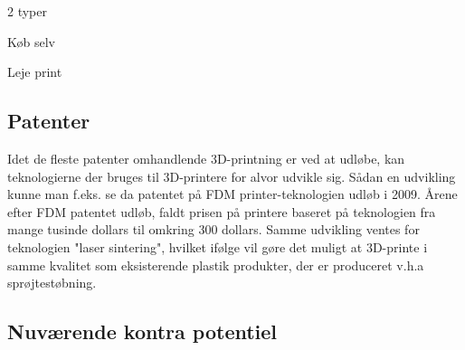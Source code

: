 2 typer

Køb selv

Leje print

\subsection{Patenter} %

Idet de fleste patenter omhandlende 3D-printning er ved at udløbe, kan teknologierne der bruges til 3D-printere for alvor udvikle sig. Sådan en udvikling kunne man f.eks. se da patentet på FDM printer-teknologien udløb i 2009. \autocite{manyika_disruptive_2013} Årene efter FDM patentet udløb, faldt prisen på printere baseret på teknologien fra mange tusinde dollars til omkring 300 dollars. \autocite{mims_3d_2013} Samme udvikling ventes for teknologien "laser sintering", hvilket ifølge \autocite{mims_3d_2013} vil gøre det muligt at 3D-printe i samme kvalitet som eksisterende plastik produkter, der er produceret v.h.a sprøjtestøbning.


\subsection{Nuværende kontra potentiel} %
